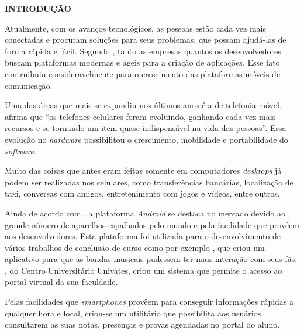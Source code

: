   \vspace{1.2em}
  \textbf{\large INTRODUÇÃO}
  \vspace{2.9em}
\thispagestyle{empty}


	\par Atualmente, com os avanços tecnológicos, as pessoas estão cada vez mais
conectadas e procuram soluções para seus problemas, que possam ajudá-las de
forma rápida e fácil. Segundo , tanto as empresas
quantos os desenvolvedores buscam plataformas modernas e ágeis para a criação
de aplicações. Esse fato contruibuiu consideravelmente para o crescimento das
plataformas móveis de comunicação.

	\par Uma das áreas que mais se expandiu nos últimos anos é a de telefonia
móvel.  afirma que “os telefones celulares
foram evoluindo, ganhando cada vez mais recursos e se tornando um item quase
indispensável na vida das pessoas”. Essa evolução no \textit{hardware}
possibilitou o crescimento, mobilidade e portabilidade do \textit{software}.

	\par Muito das coisas que antes eram feitas somente em computadores
\textit{desktops} já podem ser realizadas nos celulares, como transferências
bancárias, localização de taxi, conversas com amigos, entretenimento com jogos
e vídeos, entre outros.

	\par Ainda de acordo com , a plataforma
\textit{Android} se destaca no mercado devido ao grande número de aparelhos
espalhados pelo mundo e pela facilidade que provêem aos desenvolvedores. Esta
plataforma foi utilizada para o desenvolvimento de vários trabalhos de
conclusão de curso como por exemplo , que criou um
aplicativo para que as bandas musicais pudessem ter mais interação com seus
fãs. , do Centro Universitário Univates, criou um sistema
que permite o acesso ao portal virtual da sua faculdade.

	\par Pelas facilidades que \textit{smartphones} provêem para conseguir
informações rápidas a qualquer hora e local, criou-se um utilitário
que possibilita aos usuários consultarem as suas notas, presenças e provas
agendadas no portal do aluno.

